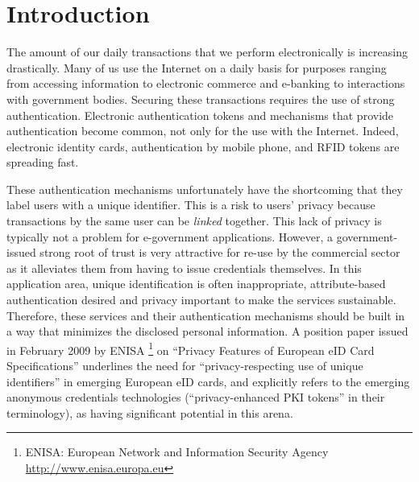 
\section{Introduction}
\label{sec:introduction}

The amount of our daily transactions that we perform electronically is increasing drastically.
Many of us use the Internet on a daily basis for 
purposes ranging from accessing information to electronic commerce and e-banking
to interactions with government bodies. 
Securing these transactions requires the use of strong authentication. 
Electronic authentication tokens and mechanisms
that provide authentication become common, not only for the use with the Internet. 
Indeed, electronic identity cards, authentication by mobile phone,
and RFID tokens are spreading fast. 


These authentication mechanisms unfortunately
have the shortcoming that they label users with a unique identifier.
This is a risk to users' privacy because   
transactions by the same user can be \emph{linked} together.
This lack of privacy is typically not a problem for e-government
applications. 
However, a government-issued strong root of trust is very
attractive for re-use by the commercial sector as it alleviates them from having to issue credentials themselves. 
In this application area, unique identification is often inappropriate, attribute-based
authentication desired and privacy important to make the services
sustainable. 
Therefore, these services and their authentication mechanisms should be
built in a way that minimizes the disclosed personal information.
A position paper issued in February 2009 by ENISA%
\footnote{ENISA: European Network and Information Security Agency \url{http://www.enisa.europa.eu}} 
on
``Privacy Features of European eID Card Specifications'' underlines the need for
``privacy-respecting use of unique identifiers'' in emerging European eID cards, and explicitly refers to the
emerging anonymous credentials technologies (``privacy-enhanced PKI tokens'' in
their terminology), as having significant potential in this arena.


